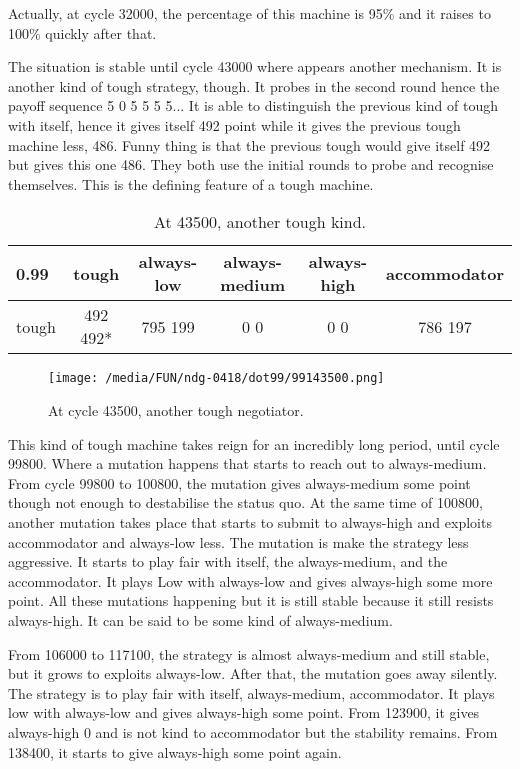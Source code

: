 \documentclass[12.5pt]{report}
\begin{document}
Actually, at cycle 32000, the percentage of this machine is 95\% and it raises to 100\% quickly after that.

The situation is stable until cycle 43000 where appears another mechanism. It is another kind of tough strategy, though. It probes in the second round hence the payoff sequence 5 0 5 5 5 5... It is able to distinguish the previous kind of tough with itself, hence it gives itself 492 point while it gives the previous tough machine less, 486. Funny thing is that the previous tough would give itself 492 but gives this one 486. They both use the initial rounds to probe and recognise themselves. This is the defining feature of a tough machine.

\begin{table}[h!]
\center
\begin{tabular}{l|ccccc}
\textbf{0.99}& tough & always-low & always-medium & always-high & accommodator\\
\hline
tough & 492 492* & 795 199  &  0 0  & 0 0  &  786 197  \\
\end{tabular}
\caption{At 43500, another tough kind.}
\end{table}
\begin{figure}[h!]
\center
\texttt{[image: /media/FUN/ndg-0418/dot99/99143500.png]}
\caption{At cycle 43500, another tough negotiator.}
\end{figure}

This kind of tough machine takes reign for an incredibly long period, until cycle 99800. Where a mutation happens that starts to reach out to always-medium. From cycle 99800 to 100800, the mutation gives always-medium some point though not enough to destabilise the status quo. At the same time of 100800, another mutation takes place that starts to submit to always-high and exploits accommodator and always-low less. The mutation is make the strategy less aggressive. It starts to play fair with itself, the always-medium, and the accommodator. It plays Low with always-low and gives always-high some more point. All these mutations happening but it is still stable because it still resists always-high. It can be said to be some kind of always-medium.

From 106000 to 117100, the strategy is almost always-medium and still stable, but it grows to exploits always-low. After that, the mutation goes away silently. The strategy is to play fair with itself, always-medium, accommodator. It plays low with always-low and gives always-high some point. From 123900, it gives always-high 0 and is not kind to accommodator but the stability remains. From 138400, it starts to give always-high some point again.
\end{document}
